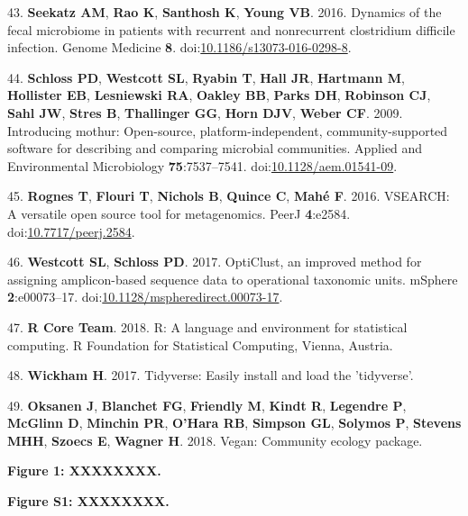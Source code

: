 \documentclass[11pt,]{article}
\begin{document}
\hypertarget{ref-Seekatz2016}{}
43. \textbf{Seekatz AM}, \textbf{Rao K}, \textbf{Santhosh K},
\textbf{Young VB}. 2016. Dynamics of the fecal microbiome in patients
with recurrent and nonrecurrent clostridium difficile infection. Genome
Medicine \textbf{8}.
doi:\href{https://doi.org/10.1186/s13073-016-0298-8}{10.1186/s13073-016-0298-8}.

\hypertarget{ref-Schloss2009}{}
44. \textbf{Schloss PD}, \textbf{Westcott SL}, \textbf{Ryabin T},
\textbf{Hall JR}, \textbf{Hartmann M}, \textbf{Hollister EB},
\textbf{Lesniewski RA}, \textbf{Oakley BB}, \textbf{Parks DH},
\textbf{Robinson CJ}, \textbf{Sahl JW}, \textbf{Stres B},
\textbf{Thallinger GG}, \textbf{Horn DJV}, \textbf{Weber CF}. 2009.
Introducing mothur: Open-source, platform-independent,
community-supported software for describing and comparing microbial
communities. Applied and Environmental Microbiology
\textbf{75}:7537--7541.
doi:\href{https://doi.org/10.1128/aem.01541-09}{10.1128/aem.01541-09}.

\hypertarget{ref-Rognes2016}{}
45. \textbf{Rognes T}, \textbf{Flouri T}, \textbf{Nichols B},
\textbf{Quince C}, \textbf{Mahé F}. 2016. VSEARCH: A versatile open
source tool for metagenomics. PeerJ \textbf{4}:e2584.
doi:\href{https://doi.org/10.7717/peerj.2584}{10.7717/peerj.2584}.

\hypertarget{ref-Westcott2017}{}
46. \textbf{Westcott SL}, \textbf{Schloss PD}. 2017. OptiClust, an
improved method for assigning amplicon-based sequence data to
operational taxonomic units. mSphere \textbf{2}:e00073--17.
doi:\href{https://doi.org/10.1128/mspheredirect.00073-17}{10.1128/mspheredirect.00073-17}.

\hypertarget{ref-r_citation_2018}{}
47. \textbf{R Core Team}. 2018. R: A language and environment for
statistical computing. R Foundation for Statistical Computing, Vienna,
Austria.

\hypertarget{ref-Tidyverse2017}{}
48. \textbf{Wickham H}. 2017. Tidyverse: Easily install and load the
'tidyverse'.

\hypertarget{ref-Vegan2018}{}
49. \textbf{Oksanen J}, \textbf{Blanchet FG}, \textbf{Friendly M},
\textbf{Kindt R}, \textbf{Legendre P}, \textbf{McGlinn D},
\textbf{Minchin PR}, \textbf{O'Hara RB}, \textbf{Simpson GL},
\textbf{Solymos P}, \textbf{Stevens MHH}, \textbf{Szoecs E},
\textbf{Wagner H}. 2018. Vegan: Community ecology package.

\newpage

\textbf{Figure 1: XXXXXXXX.}

\newpage

\textbf{Figure S1: XXXXXXXX.}
\end{document}
